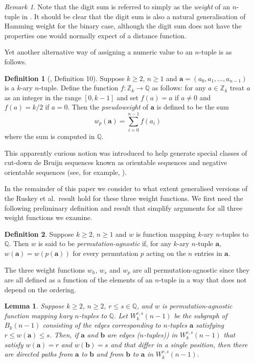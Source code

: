 \documentclass[a4paper,11pt]{article}
\theoremstyle{plain}
\newtheorem{lemma}{Lemma}[section]
\theoremstyle{definition}
\newtheorem{definition}{Definition}[section]
\theoremstyle{remark}
\newtheorem{remark}{Remark}[section]
\begin{document}
\begin{remark}
Note that the digit sum is referred to simply as the \emph{weight} of an $n$-tuple in
\cite[Definition 11]{Mitchell25a}. It should be clear that the digit sum is also a natural
generalisation of Hamming weight for the binary case, although the digit sum does not have the
properties one would normally expect of a distance function.
\end{remark}

Yet another alternative way of assigning a numeric value to an $n$-tuple is as follows.

\begin{definition}[\cite{Mitchell25a}, Definition 10] \label{definition:pseudoweight}
Suppose $k\geq2$, $n\geq1$ and $\mathbf{a}=(a_0,a_1,\dots,a_{n-1})$ is a $k$-ary $n$-tuple. Define
the function $f:\mathbb{Z}_k\rightarrow\mathbb{Q}$ as follows: for any $a\in\mathbb{Z}_k$ treat $a$
as an integer in the range $[0,k-1]$ and set $f(a)=a$ if $a\neq0$ and $f(a)=k/2$ if $a=0$. Then the
\emph{pseudoweight} of $\mathbf{a}$ is defined to be the sum
\[ w_p(\mathbf{a}) = \sum_{i=0}^{n-1}f(a_i) \]
where the sum is computed in $\mathbb{Q}$.
\end{definition}

This apparently curious notion was introduced to help generate special classes of cut-down de
Bruijn sequences known as orientable sequences and negative orientable sequences (see, for example,
\cite{Mitchell26a}).

In the remainder of this paper we consider to what extent generalised versions of the Ruskey et
al.\ result \cite{Ruskey12} hold for these three weight functions.  We first need the following
preliminary definition and result that simplify arguments for all three weight functions we
examine.

\begin{definition}
Suppose $k\geq2$, $n\geq1$ and $w$ is function mapping $k$-ary $n$-tuples to $\mathbb{Q}$.  Then
$w$ is said to be \emph{permutation-agnostic} if, for any $k$-ary $n$-tuple $\mathbf{a}$,
$w(\mathbf{a})=w(p(\mathbf{a}))$ for every permutation $p$ acting on the $n$ entries in
$\mathbf{a}$.
\end{definition}

The three weight functions $w_h$, $w_s$ and $w_p$ are all permutation-agnostic since they are all
defined as a function of the elements of an $n$-tuple in a way that does not depend on the
ordering.

\begin{lemma}  \label{lemma:one_change}
Suppose $k\geq2$, $n\geq2$, $r\leq s\in \mathbb{Q}$, and $w$ is permutation-agnostic function
mapping $k$ary $n$-tuples to $\mathbb{Q}$.  Let $W_k^{r,s}(n-1)$ be the subgraph of $B_k(n-1)$
consisting of the edges corresponding to $n$-tuples $\mathbf{a}$ satisfying $r\leq
w(\mathbf{a})\leq s$. Then, if $\mathbf{a}$ and $\mathbf{b}$ are edges ($n$-tuples)) in
$W_k^{r,s}(n-1)$ that satisfy $w(\mathbf{a})=r$ and $w(\mathbf{b})=s$ and that differ in a single
position, then there are directed paths from $\mathbf{a}$ to $\mathbf{b}$ and from $\mathbf{b}$ to
$\mathbf{a}$ in $W_k^{r,s}(n-1)$.
\end{lemma}
\end{document}

